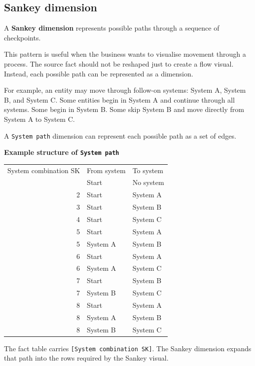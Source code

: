 \documentclass[10pt,openany,10pt]{book}
\newcounter{none}
\let\podeToprule\toprule
\let\podeMidrule\midrule
\let\podeBottomrule\bottomrule
\renewcommand{\toprule}{\arrayrulecolor{pbiGrid}\podeToprule}
\renewcommand{\midrule}{\arrayrulecolor{pbiGrid}\podeMidrule}
\renewcommand{\bottomrule}{\arrayrulecolor{pbiGrid}\podeBottomrule}
\begin{document}
\subsection{Sankey dimension}\label{sankey-dimension}

A \textbf{Sankey dimension} represents possible paths through a sequence
of checkpoints.

This pattern is useful when the business wants to visualise movement
through a process. The source fact should not be reshaped just to create
a flow visual. Instead, each possible path can be represented as a
dimension.

For example, an entity may move through follow-on systems: System A,
System B, and System C. Some entities begin in System A and continue
through all systems. Some begin in System B. Some skip System B and move
directly from System A to System C.

A \texttt{\textquotesingle{}System\ path\textquotesingle{}} dimension
can represent each possible path as a set of edges.

\textbf{Example structure of
\texttt{\textquotesingle{}System\ path\textquotesingle{}}}

{\def\LTcaptype{none} %
\begin{longtable}[]{@{}rll@{}}
\toprule\noalign{}
System combination SK & From system & To system \\
\midrule\noalign{}
\endhead
\bottomrule\noalign{}
\endlastfoot
1 & Start & No system \\
2 & Start & System A \\
3 & Start & System B \\
4 & Start & System C \\
5 & Start & System A \\
5 & System A & System B \\
6 & Start & System A \\
6 & System A & System C \\
7 & Start & System B \\
7 & System B & System C \\
8 & Start & System A \\
8 & System A & System B \\
8 & System B & System C \\
\end{longtable}
}

The fact table carries \texttt{{[}System\ combination\ SK{]}}. The
Sankey dimension expands that path into the rows required by the Sankey
visual.
\end{document}
